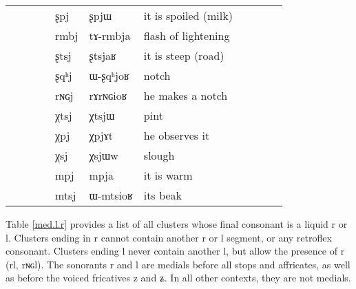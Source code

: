 \documentclass[oldfontcommands,oneside,a4paper,11pt]{article}
\newcommand{\ipa}[1]{{\phon #1}} %
\newcommand{\tib}[1]{\cellcolor{lightgray}\textbf{#1}}
\begin{document}
\begin{table}
{\begin{tabular}{l|lll|lll|lll|l}
 &	 &	&&\ipa{ʂpj} &	\ipa{ʂpjɯ} &	it is spoiled (milk)\\
 &	 &	&&\ipa{rmbj} &	\ipa{tɤ-rmbja} &	flash of lightening\\
 &	 &	&&\ipa{ʂtsj} &	\ipa{ʂtsjaʁ} &it is steep (road)	\\
 &	 &	&&\ipa{ʂqʰj} &	\ipa{ɯ-ʂqʰjoʁ} &notch	\\
 &	 &	&&\ipa{rɴɢj} &	\ipa{rɤrɴɢioʁ} &	he makes a notch\\
\midrule
 &	 &	&&\ipa{χtsj} &	\ipa{χtsjɯ} &pint	\\
 &	 &	&&\ipa{χpj} \tib{}&	\ipa{χpjɤt} &he  observes it	\\
 &	 &	&&\ipa{χsj} &	\ipa{χsjɯw} &	slough \\
\midrule
 &	 &	&&\ipa{mpj} &	\ipa{mpja} &	it is warm\\
 &	 &	&&\ipa{mtsj} &	\ipa{ɯ-mtsioʁ} &its beak	\\
\end{tabular}}
\end{table}
   \label{med.l.r}
  
  Table  \ref{med.l.r} provides a  list of all clusters whose final consonant is a liquid  \ipa{r} or \ipa{l}. Clusters ending in \ipa{r} cannot contain another \ipa{r} or \ipa{l} segment, or any retroflex consonant. Clusters ending \ipa{l} never contain another \ipa{l}, but allow the presence of \ipa{r} (\ipa{rl}, \ipa{rɴɢl}). The sonorants \ipa{r} and \ipa{l} are medials before all stops and affricates, as well as before the voiced fricatives \ipa{z} and \ipa{ʑ}. In all other contexts, they are not medials.
  
\end{document}
